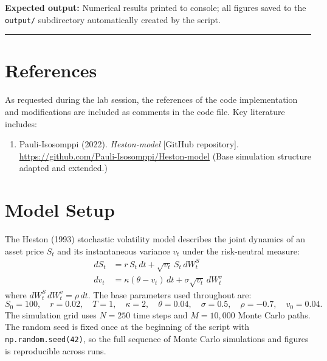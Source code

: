 \documentclass{report}
\begin{document}
\textbf{Expected output:} Numerical results printed to console; all figures saved
to the \texttt{output/} subdirectory automatically created by the script.

\rule{\textwidth}{0.4pt}

\section{References}
As requested during the lab session, the references of the code implementation and modifications are included as comments in the code file. Key literature includes:
\begin{enumerate}
    \item Pauli-Isosomppi (2022). \textit{Heston-model} [GitHub repository].
          \url{https://github.com/Pauli-Isosomppi/Heston-model}
          (Base simulation structure adapted and extended.)
\end{enumerate}

\section{Model Setup}

The Heston (1993) stochastic volatility model describes the joint dynamics of
an asset price $S_t$ and its instantaneous variance $v_t$ under the risk-neutral
measure:
\begin{align}
    dS_t &= r\,S_t\,dt + \sqrt{v_t}\,S_t\,dW_t^S \label{eq:heston_S}\\
    dv_t &= \kappa(\theta - v_t)\,dt + \sigma\sqrt{v_t}\,dW_t^v \label{eq:heston_v}
\end{align}
where $dW_t^S\,dW_t^v = \rho\,dt$.  The base parameters used throughout are:
\[
    S_0 = 100,\quad r = 0.02,\quad T = 1,\quad
    \kappa = 2,\quad \theta = 0.04,\quad \sigma = 0.5,\quad
    \rho = -0.7,\quad v_0 = 0.04.
\]
The simulation grid uses $N = 250$ time steps and $M = 10{,}000$ Monte Carlo paths.
The random seed is fixed once at the beginning of the script with
\texttt{np.random.seed(42)}, so the full sequence of Monte Carlo simulations
and figures is reproducible across runs.

\end{document}
